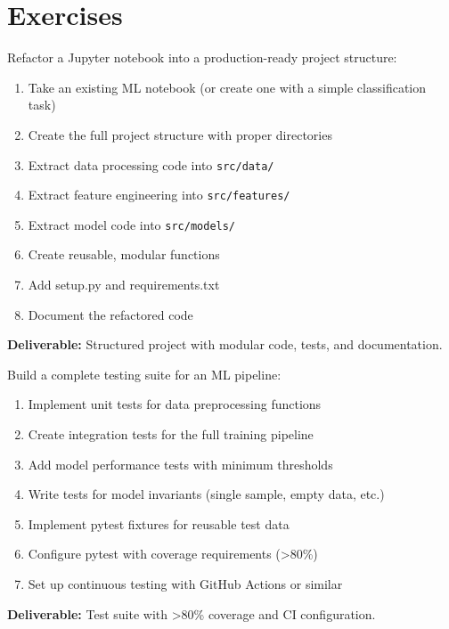 \section{Exercises}

\begin{exercise}
Refactor a Jupyter notebook into a production-ready project structure:
\begin{enumerate}
    \item Take an existing ML notebook (or create one with a simple classification task)
    \item Create the full project structure with proper directories
    \item Extract data processing code into \texttt{src/data/}
    \item Extract feature engineering into \texttt{src/features/}
    \item Extract model code into \texttt{src/models/}
    \item Create reusable, modular functions
    \item Add setup.py and requirements.txt
    \item Document the refactored code
\end{enumerate}
\textbf{Deliverable:} Structured project with modular code, tests, and documentation.
\end{exercise}

\begin{exercise}
Build a complete testing suite for an ML pipeline:
\begin{enumerate}
    \item Implement unit tests for data preprocessing functions
    \item Create integration tests for the full training pipeline
    \item Add model performance tests with minimum thresholds
    \item Write tests for model invariants (single sample, empty data, etc.)
    \item Implement pytest fixtures for reusable test data
    \item Configure pytest with coverage requirements (>80\%)
    \item Set up continuous testing with GitHub Actions or similar
\end{enumerate}
\textbf{Deliverable:} Test suite with >80\% coverage and CI configuration.
\end{exercise}

